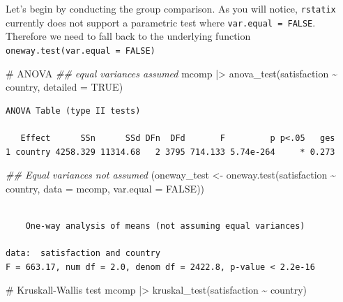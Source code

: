 \documentclass[
  letterpaper,
]{krantz}
\makeatletter
\newenvironment{Shaded}{\begin{snugshade}}{\end{snugshade}}
\newcommand{\AttributeTok}[1]{\textcolor[rgb]{0.40,0.45,0.13}{#1}}
\newcommand{\CommentTok}[1]{\textcolor[rgb]{0.37,0.37,0.37}{#1}}
\newcommand{\ConstantTok}[1]{\textcolor[rgb]{0.56,0.35,0.01}{#1}}
\newcommand{\DocumentationTok}[1]{\textcolor[rgb]{0.37,0.37,0.37}{\textit{#1}}}
\newcommand{\FunctionTok}[1]{\textcolor[rgb]{0.28,0.35,0.67}{#1}}
\newcommand{\NormalTok}[1]{\textcolor[rgb]{0.00,0.23,0.31}{#1}}
\newcommand{\OtherTok}[1]{\textcolor[rgb]{0.00,0.23,0.31}{#1}}
\newcommand{\SpecialCharTok}[1]{\textcolor[rgb]{0.37,0.37,0.37}{#1}}
\newenvironment{kframe}{%
\medskip{}
\setlength{\fboxsep}{.8em}
 \def\at@end@of@kframe{}%
 \ifinner\ifhmode%
  \def\at@end@of@kframe{\end{minipage}}%
  \begin{minipage}{\columnwidth}%
 \fi\fi%
 \def\FrameCommand##1{\hskip\@totalleftmargin \hskip-\fboxsep
 \colorbox{shadecolor}{##1}\hskip-\fboxsep
     \hskip-\linewidth \hskip-\@totalleftmargin \hskip\columnwidth}%
 \MakeFramed {\advance\hsize-\width
   \@totalleftmargin\z@ \linewidth\hsize
   \@setminipage}}%
 {\par\unskip\endMakeFramed%
 \at@end@of@kframe}
\renewenvironment{Shaded}{\begin{kframe}}{\end{kframe}}
\makeatother
\begin{document}
Let's begin by conducting the group comparison. As you will notice,
\texttt{rstatix} currently does not support a parametric test where
\texttt{var.equal\ =\ FALSE}. Therefore we need to fall back to the
underlying function \texttt{oneway.test(var.equal\ =\ FALSE)}

\begin{Shaded}
\begin{Highlighting}[]
\CommentTok{\# ANOVA}
\DocumentationTok{\#\# equal variances assumed}
\NormalTok{mcomp }\SpecialCharTok{|\textgreater{}}
  \FunctionTok{anova\_test}\NormalTok{(satisfaction }\SpecialCharTok{\textasciitilde{}}\NormalTok{ country,}
              \AttributeTok{detailed =} \ConstantTok{TRUE}\NormalTok{)}
\end{Highlighting}
\end{Shaded}

\begin{verbatim}
ANOVA Table (type II tests)

   Effect      SSn      SSd DFn  DFd       F         p p<.05   ges
1 country 4258.329 11314.68   2 3795 714.133 5.74e-264     * 0.273
\end{verbatim}

\begin{Shaded}
\begin{Highlighting}[]
\DocumentationTok{\#\# Equal variances not assumed}
\NormalTok{(oneway\_test }\OtherTok{\textless{}{-}} \FunctionTok{oneway.test}\NormalTok{(satisfaction }\SpecialCharTok{\textasciitilde{}}\NormalTok{ country,}
                            \AttributeTok{data =}\NormalTok{ mcomp,}
                            \AttributeTok{var.equal =} \ConstantTok{FALSE}\NormalTok{))}
\end{Highlighting}
\end{Shaded}

\begin{verbatim}

    One-way analysis of means (not assuming equal variances)

data:  satisfaction and country
F = 663.17, num df = 2.0, denom df = 2422.8, p-value < 2.2e-16
\end{verbatim}

\begin{Shaded}
\begin{Highlighting}[]
\CommentTok{\# Kruskall{-}Wallis test}
\NormalTok{mcomp }\SpecialCharTok{|\textgreater{}} \FunctionTok{kruskal\_test}\NormalTok{(satisfaction }\SpecialCharTok{\textasciitilde{}}\NormalTok{ country)}
\end{Highlighting}
\end{Shaded}
\end{document}
